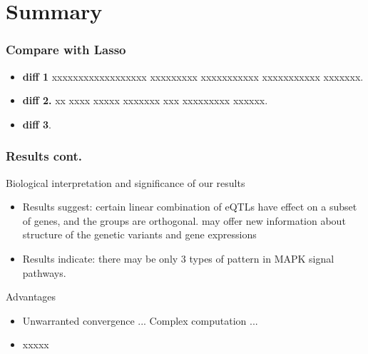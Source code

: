 \section{Summary}
\begin{frame}
\sectionpage
\end{frame}

\begin{frame}
    \frametitle{Compare with Lasso}
    \begin{itemize}
        \item \textbf{diff 1} xxxxxxxxxxxxxxxxxx xxxxxxxxx xxxxxxxxxxx xxxxxxxxxxx xxxxxxx.
        \item \textbf{diff 2.} xx xxxx xxxxx xxxxxxx xxx xxxxxxxxx xxxxxx.
        \item \textbf{diff 3}.
    \end{itemize}
\end{frame}

\begin{frame}
    \frametitle{Results cont.}
    \begin{block}{Biological interpretation and significance of our results}
        \begin{itemize}
            \item Results suggest:
            certain linear combination of eQTLs have effect on a subset of genes, and the groups are orthogonal. 
            may offer new information about structure of the genetic variants and gene expressions
            \item Results indicate:
            there may be only $3$ types of pattern in MAPK signal pathways. 
        \end{itemize}
    \end{block}
\end{frame}

\begin{frame}
    \begin{block}{Advantages}
        \begin{itemize}
            \item Unwarranted convergence ... Complex computation ... 
            \item xxxxx
        \end{itemize}
    \end{block}
\end{frame}

